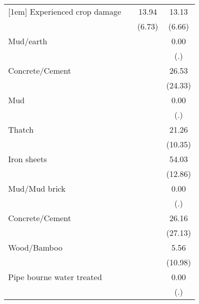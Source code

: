 {\begin{tabular}{l*{3}{c}}
[1em]
Experienced crop damage&                     &       13.94\sym{*}  &       13.13         \\
                    &                     &      (6.73)         &      (6.66)         \\
[1em]
Mud/earth           &                     &                     &        0.00         \\
                    &                     &                     &         (.)         \\
[1em]
Concrete/Cement     &                     &                     &       26.53         \\
                    &                     &                     &     (24.33)         \\
[1em]
Mud                 &                     &                     &        0.00         \\
                    &                     &                     &         (.)         \\
[1em]
Thatch              &                     &                     &       21.26\sym{*}  \\
                    &                     &                     &     (10.35)         \\
[1em]
Iron sheets         &                     &                     &       54.03\sym{***}\\
                    &                     &                     &     (12.86)         \\
[1em]
Mud/Mud brick       &                     &                     &        0.00         \\
                    &                     &                     &         (.)         \\
[1em]
Concrete/Cement     &                     &                     &       26.16         \\
                    &                     &                     &     (27.13)         \\
[1em]
Wood/Bamboo         &                     &                     &        5.56         \\
                    &                     &                     &     (10.98)         \\
[1em]
Pipe bourne water treated&                     &                     &        0.00         \\
                    &                     &                     &         (.)         \\

\end{tabular}}
